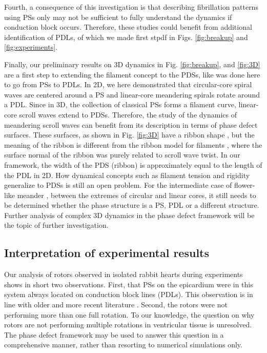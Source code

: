 \documentclass{article}
\begin{document}
Fourth, a consequence of this investigation is that describing fibrillation patterns using PSs only \citep{Gray:1995,Gurevich:2019} may not be sufficient to fully understand the dynamics if conduction block occurs. Therefore, these studies could benefit from additional identification of PDLs, of which we made first stpdf in Figs. \ref{fig:breakup} and \ref{fig:experiments}. 

Finally, our preliminary results on 3D dynamics in Fig. \ref{fig:breakup}, and \ref{fig:3D} are a first step to extending the filament concept to the PDSs, like was done here to go from PSs to  PDLs. In 2D, we here demonstrated that circular-core spiral waves are centered around a PS and linear-core meandering spirals rotate around a PDL. Since in 3D, the collection of classical PSs forms a filament curve, linear-core scroll waves extend to PDSs. Therefore, the study of the dynamics of meandering scroll waves can benefit from its description in terms of phase defect surfaces. These surfaces, as shown in Fig. \ref{fig:3D} have a ribbon shape \citep{Efimov:1999}, but the meaning of the ribbon is different from the ribbon model for filaments \citep{Echebarria:2006}, where the surface normal of the ribbon was purely related to scroll wave twist. In our framework, the width of the PDS (ribbon) is approximately equal to the length of the PDL in 2D. How dynamical concepts such as filament tension \citep{Biktashev:1994} and rigidity \citep{Dierckx:2012} generalize to PDSs is still an open problem. For the intermediate case of flower-like meander \citep{Barkley:1990b}, between the extremes of circular and linear cores, it still needs to be determined whether the phase structure  is a PS, PDL or a different structure. Further analysis of complex 3D dynamics in the phase defect framework will be the topic of further investigation.

\subsection{Interpretation of experimental results}

Our analysis of rotors observed in isolated rabbit hearts during experiments shows in short two observations. First, that PSs on the epicardium were in this system always located on conduction block lines (PDLs). This observation is in line with older and more recent literature \citep{Efimov:1999,Podziemski:2018}. Second, the rotors were not performing more than one full rotation. To our knowledge, the question on why rotors are not performing multiple rotations in ventricular tissue is unresolved. The phase defect framework may be used to answer this question in a comprehensive manner, rather than resorting to numerical simulations only. 
\end{document}

